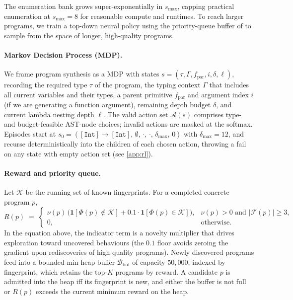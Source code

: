 \documentclass[12pt]{article}
\begin{document}
The enumeration bank grows super-exponentially in $s_{\max}$, capping practical enumeration at $s_{\max} = 8$ for reasonable compute and runtimes. To reach larger programs, we train a top-down neural policy using the priority-queue buffer of \citet{abolafia2018priority} to sample from the space of longer, high-quality programs.

\paragraph{Markov Decision Process (MDP).} We frame program synthesis as a MDP with states $s = (\tau, \Gamma, f_{\text{par}}, i, \delta, \ell)$, recording the required type $\tau$ of the program, the typing context $\Gamma$ that includes all current variables and their types, a parent primitive $f_{\mathrm{par}}$ and argument index $i$ (if we are generating a function argument), remaining depth budget $\delta$, and current lambda nesting depth $\ell$. The valid action set $\mathcal{A}(s)$ comprises type- and budget-feasible AST-node choices; invalid actions are masked at the softmax. Episodes start at $s_0 = ([\texttt{Int}]\!\to\![\texttt{Int}],\,\emptyset,\,\cdot,\,\cdot,\,\delta_{\max},\,0)$ with $\delta_{\max} = 12$, and recurse deterministically into the children of each chosen action, throwing a fail on any state with empty action set (see \cref{app:rl}).

\paragraph{Reward and priority queue.} Let $\mathcal{K}$ be the running set of known fingerprints. For a completed concrete program $p$,
\begin{equation}
  R(p) \;=\;
    \begin{cases}
      \nu(p)\,\bigl(\mathbf{1}[\Phi(p)\notin\mathcal{K}] + 0.1\cdot\mathbf{1}[\Phi(p)\in\mathcal{K}]\bigr), & \nu(p) > 0 \text{ and } |\mathcal{F}(p)| \geq 3, \\
      0, & \text{otherwise.}
    \end{cases}
  \label{eq:reward}
\end{equation}
In the equation above, the indicator term is a novelty multiplier that drives exploration toward uncovered behaviours (the $0.1$ floor avoids zeroing the gradient upon rediscoveries of high quality programs). Newly discovered programs feed into a bounded min-heap buffer $\mathcal{B}_{\mathrm{buf}}$ of capacity $50{,}000$, indexed by fingerprint, which retains the top-$K$ programs by reward. A candidate $p$ is admitted into the heap iff its fingerprint is new, and either the buffer is not full or $R(p)$ exceeds the current minimum reward on the heap.
\end{document}
